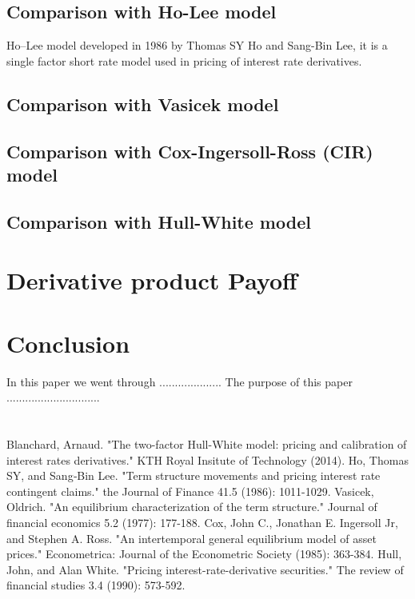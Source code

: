 \documentclass{article}
\begin{document}
\subsection{Comparison with Ho-Lee model
}
Ho–Lee model developed in 1986 \cite{HoLee1} by Thomas SY Ho and Sang-Bin Lee, it is a single factor short rate model used in pricing of interest rate derivatives.

\subsection{Comparison with Vasicek model
}

\subsection{Comparison with Cox-Ingersoll-Ross (CIR) model
}

\subsection{Comparison with Hull-White model
}

\section{Derivative product Payoff}


\section{Conclusion}

In this paper we went through ....................  The purpose of this paper ..............................

\newpage
\section*{} \label{bibsection}


\begin{thebibliography}{MMMMM} 
 Blanchard, Arnaud. "The two-factor Hull-White model: pricing and calibration of interest rates derivatives." KTH Royal Insitute of Technology (2014).
 Ho, Thomas SY, and Sang‐Bin Lee. "Term structure movements and pricing interest rate contingent claims." the Journal of Finance 41.5 (1986): 1011-1029.
 Vasicek, Oldrich. "An equilibrium characterization of the term structure." Journal of financial economics 5.2 (1977): 177-188.
 Cox, John C., Jonathan E. Ingersoll Jr, and Stephen A. Ross. "An intertemporal general equilibrium model of asset prices." Econometrica: Journal of the Econometric Society (1985): 363-384.
 Hull, John, and Alan White. "Pricing interest-rate-derivative securities." The review of financial studies 3.4 (1990): 573-592.

\end{thebibliography}


\end{document}
